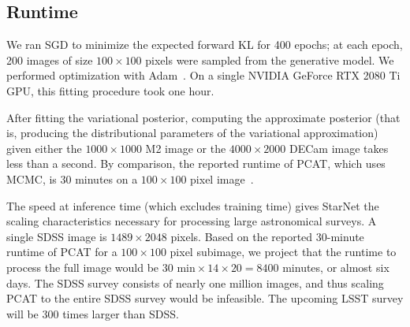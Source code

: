 




\subsection{Runtime}
\label{sec:runtime}
We ran SGD to minimize the expected forward KL
for 400 epochs; at each epoch, 200 images of size $100\times100$ pixels were sampled from the generative model.
We performed optimization with Adam~\citep{kingma2014adam}.
On a single NVIDIA GeForce RTX 2080 Ti GPU,
this fitting procedure took one hour.

After fitting the variational posterior,
computing the approximate posterior
(that is, producing the distributional parameters of the variational approximation) given either the $1000\times1000$ M2 image
or the $4000 \times 2000$ DECam image
takes less than a second. 
By comparison, the reported runtime of PCAT, which uses MCMC, is 30 minutes on a $100 \times 100$ pixel image~\citep{Feder_2019}.

The speed at inference time (which excludes training time) gives StarNet the scaling characteristics necessary for processing large astronomical surveys.
A single SDSS image is $1489 \times 2048$ pixels.
Based on the reported 30-minute runtime of PCAT for a $100\times100$ pixel subimage, we project that
the runtime to process the full image would be $30\text{ min} \times 14 \times 20 = 8400$ minutes, or almost six days.
The SDSS survey consists of nearly one million images, and thus scaling PCAT to the entire SDSS survey would be infeasible.
The upcoming LSST survey will be 300 times larger than SDSS.


